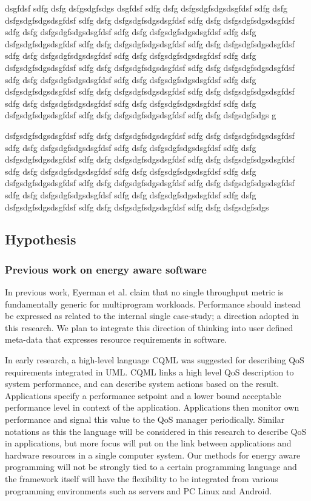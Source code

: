\documentclass{article}
\begin{document}
dsgfdsf sdfg dsfg dsfgsdgfsdgs
dsgfdsf sdfg dsfg dsfgsdgfsdgsdsgfdsf sdfg dsfg dsfgsdgfsdgsdsgfdsf sdfg dsfg dsfgsdgfsdgsdsgfdsf sdfg dsfg dsfgsdgfsdgsdsgfdsf sdfg dsfg dsfgsdgfsdgsdsgfdsf sdfg dsfg dsfgsdgfsdgsdsgfdsf sdfg dsfg dsfgsdgfsdgsdsgfdsf sdfg dsfg dsfgsdgfsdgsdsgfdsf sdfg dsfg dsfgsdgfsdgsdsgfdsf sdfg dsfg dsfgsdgfsdgsdsgfdsf sdfg dsfg dsfgsdgfsdgsdsgfdsf sdfg dsfg dsfgsdgfsdgsdsgfdsf sdfg dsfg dsfgsdgfsdgsdsgfdsf sdfg dsfg dsfgsdgfsdgsdsgfdsf sdfg dsfg dsfgsdgfsdgsdsgfdsf sdfg dsfg dsfgsdgfsdgsdsgfdsf sdfg dsfg dsfgsdgfsdgsdsgfdsf sdfg dsfg dsfgsdgfsdgsdsgfdsf sdfg dsfg dsfgsdgfsdgsdsgfdsf sdfg dsfg dsfgsdgfsdgsdsgfdsf sdfg dsfg dsfgsdgfsdgsdsgfdsf sdfg dsfg dsfgsdgfsdgsdsgfdsf sdfg dsfg dsfgsdgfsdgsdsgfdsf sdfg dsfg dsfgsdgfsdgs
g

dsfgsdgfsdgsdsgfdsf sdfg dsfg dsfgsdgfsdgsdsgfdsf sdfg dsfg dsfgsdgfsdgsdsgfdsf sdfg dsfg dsfgsdgfsdgsdsgfdsf sdfg dsfg dsfgsdgfsdgsdsgfdsf sdfg dsfg dsfgsdgfsdgsdsgfdsf sdfg dsfg dsfgsdgfsdgsdsgfdsf sdfg dsfg dsfgsdgfsdgsdsgfdsf sdfg dsfg dsfgsdgfsdgsdsgfdsf sdfg dsfg dsfgsdgfsdgsdsgfdsf sdfg dsfg dsfgsdgfsdgsdsgfdsf sdfg dsfg dsfgsdgfsdgsdsgfdsf sdfg dsfg dsfgsdgfsdgsdsgfdsf sdfg dsfg dsfgsdgfsdgsdsgfdsf sdfg dsfg dsfgsdgfsdgsdsgfdsf sdfg dsfg dsfgsdgfsdgsdsgfdsf sdfg dsfg dsfgsdgfsdgsdsgfdsf sdfg dsfg dsfgsdgfsdgs

\subsection{Hypothesis}

\subsubsection{Previous work on energy aware software}
In previous work, Eyerman et al. \cite{Eyerman:09} claim that no single throughput metric is fundamentally generic for multiprogram workloads. 
Performance should instead be expressed as related to the internal single case-study; a direction adopted in this research. 
We plan to integrate this direction of thinking into user defined meta-data that expresses resource requirements in software.

In early research, a high-level language CQML \cite{Aagedal:01} was suggested for describing QoS requirements integrated in UML. 
CQML links a high level QoS description to system performance, and can describe system actions based on the result. 
Applications specify a performance setpoint and a lower bound acceptable performance level in context of the application. 
Applications then monitor own performance and signal this value to the QoS manager periodically. 
Similar notations as this the language will be considered in this research to describe QoS in applications, 
but more focus will put on the link between applications and hardware resources in a single computer system.
Our methods for energy aware programming will not be strongly tied to a certain programming language and the framework itself will have the flexibility to be integrated from various programming environments such as servers and PC Linux and Android.
\end{document}
